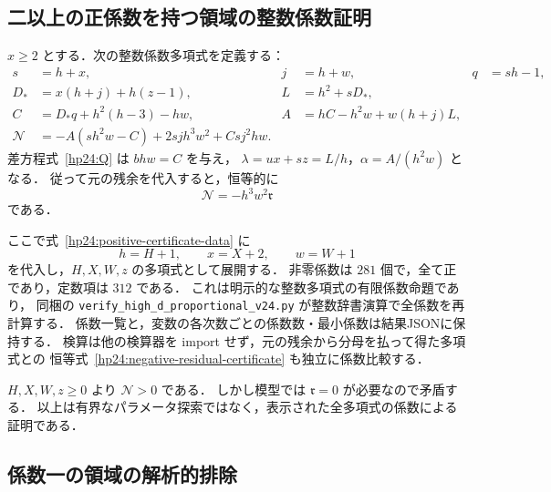 \subsection{二以上の正係数を持つ領域の整数係数証明}

$x\ge2$ とする．次の整数係数多項式を定義する：
\begin{equation}\label{hp24:positive-certificate-data}
\begin{aligned}
s&=h+x,&j&=h+w,&q&=sh-1,\\
D_*&=x(h+j)+h(z-1),& L&=h^2+sD_*,\\
C&=D_*q+h^2(h-3)-hw,&
A&=hC-h^2w+w(h+j)L,\\
\mathcal N&=-A(sh^2w-C)+2sjh^3w^2+Csj^2hw.
\end{aligned}
\end{equation}
差方程式~\eqref{hp24:Q} は $bhw=C$ を与え，
$\lambda=ux+sz=L/h$，$\alpha=A/(h^2w)$ となる．
従って元の残余を代入すると，恒等的に
\begin{equation}\label{hp24:negative-residual-certificate}
 \mathcal N=-h^3w^2\mathfrak r
\end{equation}
である．

ここで式~\eqref{hp24:positive-certificate-data} に
\[
 h=H+1,\qquad x=X+2,\qquad w=W+1
\]
を代入し，$H,X,W,z$ の多項式として展開する．
非零係数は $281$ 個で，全て正であり，定数項は $312$ である．
これは明示的な整数多項式の有限係数命題であり，
同梱の \nolinkurl{verify_high_d_proportional_v24.py} が整数辞書演算で全係数を再計算する．
係数一覧と，変数の各次数ごとの係数数・最小係数は結果JSONに保持する．
検算は他の検算器を import せず，元の残余から分母を払って得た多項式との
恒等式~\eqref{hp24:negative-residual-certificate} も独立に係数比較する．

$H,X,W,z\ge0$ より $\mathcal N>0$ である．
しかし模型では $\mathfrak r=0$ が必要なので矛盾する．
以上は有界なパラメータ探索ではなく，表示された全多項式の係数による証明である．

\subsection{係数一の領域の解析的排除}

